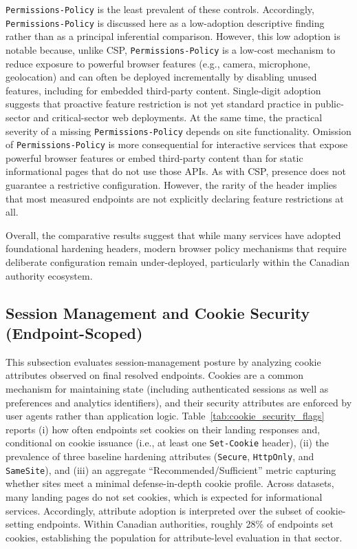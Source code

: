 \documentclass[a4paper,fleqn]{cas-sc}
\begin{document}
    \texttt{Permissions-Policy} is the least prevalent of these controls.
    Accordingly, \texttt{Permissions-Policy} is discussed here as a low-adoption descriptive finding rather than as a principal inferential comparison.
    However, this low adoption is notable because, unlike CSP, \texttt{Permissions-Policy} is a low-cost mechanism to reduce exposure to powerful browser features (e.g., camera, microphone, geolocation) and can often be deployed incrementally by disabling unused features, including for embedded third-party content.
    Single-digit adoption suggests that proactive feature restriction is not yet standard practice in public-sector and critical-sector web deployments.
    At the same time, the practical severity of a missing \texttt{Permissions-Policy} depends on site functionality. Omission of \texttt{Permissions-Policy} is more consequential for interactive services that expose powerful browser features or embed third-party content than for static informational pages that do not use those APIs.
    As with CSP, presence does not guarantee a restrictive configuration. However, the rarity of the header implies that most measured endpoints are not explicitly declaring feature restrictions at all.
    
    Overall, the comparative results suggest that while many services have adopted foundational hardening headers, modern browser policy mechanisms that require deliberate configuration remain under-deployed, particularly within the Canadian authority ecosystem. 
    
\subsection{Session Management and Cookie Security (Endpoint-Scoped)}\label{sec:results_cookies}

    This subsection evaluates session-management posture by analyzing cookie attributes observed on final resolved endpoints. 
    Cookies are a common mechanism for maintaining state (including authenticated sessions as well as preferences and analytics identifiers), and their security attributes are enforced by user agents rather than application logic. 
    Table~\ref{tab:cookie_security_flags} reports 
    (i) how often endpoints set cookies on their landing responses and, conditional on cookie issuance (i.e., at least one \texttt{Set-Cookie} header), 
    (ii) the prevalence of three baseline hardening attributes (\texttt{Secure}, \texttt{HttpOnly}, and \texttt{SameSite}), and 
    (iii) an aggregate ``Recommended/Sufficient'' metric capturing whether sites meet a minimal defense-in-depth cookie profile. 
    Across datasets, many landing pages do not set cookies, which is expected for informational services. Accordingly, attribute adoption is interpreted over the subset of cookie-setting endpoints. 
    Within Canadian authorities, roughly 28\% of endpoints set cookies, establishing the population for attribute-level evaluation in that sector.
\end{document}
